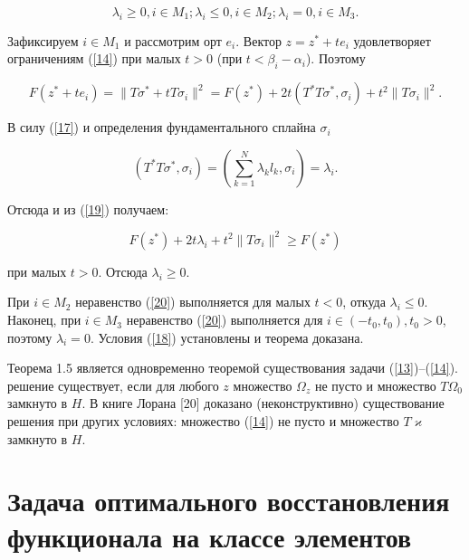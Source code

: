 \documentclass{book}
\begin{document}
\begin{equation}
\lambda_i\geq0, i\in M_1; \lambda_i\leq0, i\in M_2; \lambda_i=0, i\in M_3.
\label{18}
\end{equation}

\par Зафиксируем $i\in M_1$ и рассмотрим орт $e_i$. Вектор $z=z^*+te_i$ удовлетворяет ограничениям (\ref{14}) при малых $t>0$ (при $t<\beta_i-\alpha_i$). Поэтому

\begin{equation}
F(z^*+te_i)=\|T\sigma^*+tT\sigma_i\|^2=F(z^*)+2t(T^*T\sigma^*, \sigma_i)+t^2\|T\sigma_i\|^2.
\label{19}
\end{equation}

\noindent В силу (\ref{17}) и определения фундаментального сплайна $\sigma_i$

\begin{equation*}
(T^*T\sigma^*, \sigma_i)=\left(\sum_{k=1}^N\lambda_kl_k, \sigma_i\right)=\lambda_i.
\end{equation*}

\noindent Отсюда и из (\ref{19}) получаем:

\begin{equation}
F(z^*)+2t\lambda_i+t^2\|T\sigma_i\|^2\geq F(z^*)
\label{20}
\end{equation}

\noindent при малых $t>0$. Отсюда $\lambda_i\geq0$.
\par При $i\in M_2$ неравенство (\ref{20}) выполняется для малых $t<0$, откуда $\lambda_i\leq0$. Наконец, при $i\in M_3$ неравенство (\ref{20}) выполняется для $i\in(-t_0, t_0), t_0>0$, поэтому $\lambda_i=0$. Условия (\ref{18}) установлены и теорема доказана.
\par Теорема 1.5 является одновременно теоремой существования задачи (\ref{13})--(\ref{14}). решение существует, если для любого $z$ множество $\Omega_z$ не пусто и множество $T\Omega_0$ замкнуто в $H$. В книге Лорана [20] доказано (неконструктивно) существование решения при других условиях: множество (\ref{14}) не пусто и множество $T\varkappa$ замкнуто в $H$.

\section{Задача оптимального восстановления функционала на классе элементов}
\setcounter{equation}{0}
\end{document}
